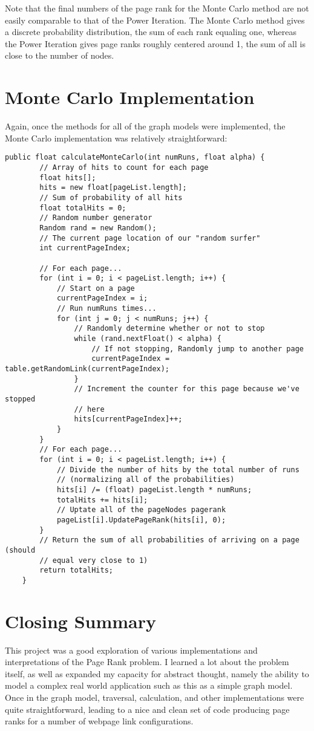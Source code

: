 \documentclass[11pt]{article}
\begin{document}
Note that the final numbers of the page rank for the Monte Carlo method are not easily comparable to that of the Power Iteration. The Monte Carlo method gives a discrete probability distribution, the sum of each rank equaling one, whereas the Power Iteration gives page ranks roughly centered around 1, the sum of all is close to the number of nodes.

\section*{Monte Carlo Implementation}
Again, once the methods for all of the graph models were implemented, the Monte Carlo implementation was relatively straightforward:
\begin{lstlisting}
public float calculateMonteCarlo(int numRuns, float alpha) {
		// Array of hits to count for each page
		float hits[];
		hits = new float[pageList.length];
		// Sum of probability of all hits
		float totalHits = 0;
		// Random number generator
		Random rand = new Random();
		// The current page location of our "random surfer"
		int currentPageIndex;

		// For each page...
		for (int i = 0; i < pageList.length; i++) {
			// Start on a page
			currentPageIndex = i;
			// Run numRuns times...
			for (int j = 0; j < numRuns; j++) {
				// Randomly determine whether or not to stop
				while (rand.nextFloat() < alpha) {
					// If not stopping, Randomly jump to another page
					currentPageIndex = table.getRandomLink(currentPageIndex);
				}
				// Increment the counter for this page because we've stopped
				// here
				hits[currentPageIndex]++;
			}
		}
		// For each page...
		for (int i = 0; i < pageList.length; i++) {
			// Divide the number of hits by the total number of runs
			// (normalizing all of the probabilities)
			hits[i] /= (float) pageList.length * numRuns;
			totalHits += hits[i];
			// Uptate all of the pageNodes pagerank
			pageList[i].UpdatePageRank(hits[i], 0);
		}
		// Return the sum of all probabilities of arriving on a page (should
		// equal very close to 1)
		return totalHits;
	}
\end{lstlisting}
\section*{Closing Summary}
This project was a good exploration of various implementations and interpretations of the Page Rank problem. I learned a lot about the problem itself, as well as expanded my capacity for abstract thought, namely the ability to model a complex real world application such as this as a simple graph model. Once in the graph model, traversal, calculation, and other implementations were quite straightforward, leading to a nice and clean set of code producing page ranks for a number of webpage link configurations.
\end{document}
